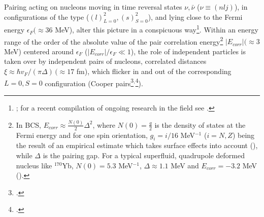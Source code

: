 Pairing acting on nucleons moving in time reversal states $\nu,\bar\nu$ ($\nu\equiv(nlj)$), in configurations of the type ($(l)^2_{L=0},(s)^2_{S=0}$), and lying close to the Fermi energy $\epsilon_F(\approx 36$ MeV), alter this picture in a conspicuous way\footnote{\cite{Bohr:58}; for a recent compilation of ongoing research in the field see \cite{Broglia:13}.}. Within an energy range of the order of the absolute value of the pair correlation energy\footnote{In BCS, $E_{corr}\approx\frac{N(0)}{2}\Delta^2$, where $N(0)=\frac{g}{2}$ is the density of states at the Fermi energy and for one spin orientation, $g_i=i/16$ MeV$^{-1}$ ($i=N,Z$) being the result of an empirical estimate which takes surface effects into account (\cite{Bohr:75,Bortignon:98}), while $\Delta$ is the pairing gap. For a typical superfluid, quadrupole deformed nucleus like $^{170}$Yb, $N(0)=5.3$ MeV$^{-1}$, $\Delta\approx1.1$ MeV and $E_{corr}=-3.2$ MeV (\cite{Shimizu:89}).} $|E_{corr}|(\approx 3 $MeV) centered around $\epsilon_F$ ($|E_{corr}|/\epsilon_F\ll1$), the role of independent particles is taken over by independent pairs of nucleons, correlated distances $\xi\approx\hbar v_F/(\pi\Delta)\,(\approx 17$ fm), which flicker in and out of the corresponding $L=0, S=0$ configuration (Cooper pairs\footnote{\cite{Cooper:56}.}$^{,}$\footnote{\cite{Brink:05}.}).


